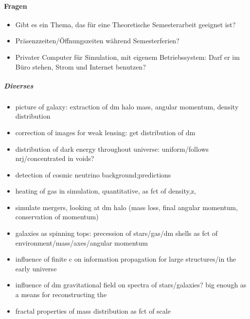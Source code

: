 \documentclass[10pt]{report}
\begin{document}
\paragraph{Fragen}
\begin{itemize}
\item Gibt es ein Thema, das f\"ur eine Theoretische Semesterarbeit geeignet ist?
\item Pr\"asenzzeiten/\"Offnungszeiten w\"ahrend Semesterferien?
\item Privater Computer f\"ur Simulation, mit eigenem Betriebssystem: Darf er im B\"uro stehen, Strom und Internet benutzen?
\end{itemize}
%
\subparagraph{Diverses}
%
\begin{itemize}
\item picture of galaxy: extraction of dm halo mass, angular momentum, density distribution
\item correction of images for weak lensing: get distribution of dm
\item distribution of dark energy throughout universe: uniform/follows nrj/concentrated in voids?
\item detection of cosmic neutrino background;predictions

\item heating of gas in simulation, quantitative, as fct of density,z,
\item simulate mergers, looking at dm halo (mass loss, final angular momentum, conservation of momentum)
\item galaxies as spinning tops: precession of stars/gas/dm shells as fct of environment/mass/axes/angular momentum

\item influence of finite c on information propagation for large structures/in the early universe
\item influence of dm gravitational field on spectra of stars/galaxies? big enough as a means for reconstructing the
\item fractal properties of mass distribution as fct of scale
\end{itemize}
%
\end{document}
